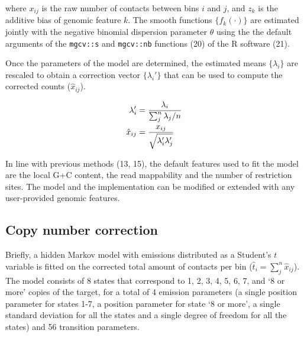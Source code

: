 \documentclass[a4,center,fleqn]{NAR}
\providecommand{\DIFadd}[1]{{\protect\color{red}#1}} %
\providecommand{\DIFdel}[1]{{\protect}}                      %
\providecommand{\DIFaddbegin}{} %
\providecommand{\DIFaddend}{} %
\providecommand{\DIFdelbegin}{} %
\providecommand{\DIFdelend}{} %
\begin{document}
\noindent
where $x_{ij}$ is the raw number of contacts between bins $i$ and $j$, and
$z_k$ is the additive bias of genomic feature $k$. The smooth functions
$\{f_k(\cdot)\}$ are estimated jointly with the negative binomial
dispersion parameter $\theta$ using the \DIFaddbegin \DIFadd{the default arguments of the
}\DIFaddend \texttt{mgcv\DIFaddbegin \DIFadd{::s}\DIFaddend } \DIFdelbegin \DIFdel{package
}\DIFdelend \DIFaddbegin \DIFadd{and }\texttt{\DIFadd{mgcv::nb}} \DIFadd{functions }\DIFaddend (20) of the R
software (21).


Once the parameters of the model are determined, the estimated means
$\{\lambda_i\}$ are rescaled to obtain a correction vector
$\{\lambda_i'\}$ that can be used to compute the corrected counts
($\hat{x}_{ij}$).

\begin{align}
\notag
\lambda_i' &= \frac{\lambda_i}{\sum_j^n{\lambda_j}/n} \\
\label{eq:xhat}
\hat{x}_{ij} &= \frac{x_{ij}}{\sqrt{\lambda_i'\lambda_j'}}
\end{align}

In line with previous methods
(13, 15), the default features
used to fit the model are the local G+C content, the read mappability and
the \DIFdelbegin \DIFdel{content and }\DIFdelend number of restriction sites. The model and the
implementation can be \DIFdelbegin \DIFdel{modifed }\DIFdelend \DIFaddbegin \DIFadd{modified }\DIFaddend or extended with any user-provided genomic
features.

\subsection{Copy number correction}
\DIFdelbegin %
\DIFdelend 

Briefly, a hidden Markov model with emissions distributed as a Student's
$t$ variable is fitted on the corrected total amount of contacts per bin
(\DIFdelbegin \DIFdel{$\lambda_i'$}\DIFdelend \DIFaddbegin \DIFadd{$\hat{t}_i = \sum_j^n{\hat{x}_{ij}}$}\DIFaddend ). The model consists of \DIFdelbegin \DIFdel{7 }\DIFdelend \DIFaddbegin \DIFadd{8 }\DIFaddend states that correspond to 1, 2, 3,
4, 5, 6\DIFdelbegin \DIFdel{and }\DIFdelend \DIFaddbegin \DIFadd{, 7, and `}\DIFaddend 8 \DIFaddbegin \DIFadd{or more' }\DIFaddend copies of the target, for a total of \DIFdelbegin \DIFdel{3 }\DIFdelend \DIFaddbegin \DIFadd{4
}\DIFaddend emission parameters (a single \DIFdelbegin \DIFdel{scaling parameter , a }\DIFdelend \DIFaddbegin \DIFadd{position parameter for states 1-7, a
position parameter for state `8 or more', a }\DIFaddend single standard deviation \DIFaddbegin \DIFadd{for
all the states }\DIFaddend and a single degree of freedom for all the states) and \DIFdelbegin \DIFdel{21 }\DIFdelend \DIFaddbegin \DIFadd{56
}\DIFaddend transition parameters. 
\end{document}
